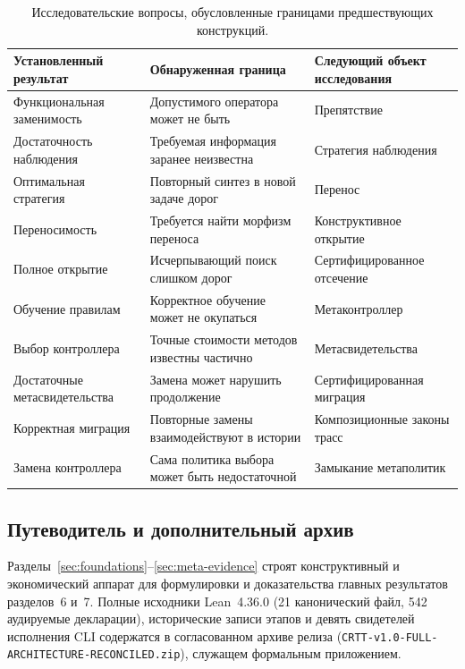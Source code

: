 \documentclass[10pt,a4paper]{article}
\begin{document}
\begin{table}[h]
\centering
\footnotesize
\begin{tabular}{@{}>{\raggedright\arraybackslash}p{3.6cm}>{\raggedright\arraybackslash}p{5.2cm}>{\raggedright\arraybackslash}p{4.6cm}@{}}
\toprule
\textbf{Установленный результат} & \textbf{Обнаруженная граница} & \textbf{Следующий объект исследования} \\
\midrule
Функциональная заменимость & Допустимого оператора может не быть & Препятствие \\
Достаточность наблюдения & Требуемая информация заранее неизвестна & Стратегия наблюдения \\
Оптимальная стратегия & Повторный синтез в новой задаче дорог & Перенос \\
Переносимость & Требуется найти морфизм переноса & Конструктивное открытие \\
Полное открытие & Исчерпывающий поиск слишком дорог & Сертифицированное отсечение \\
Обучение правилам & Корректное обучение может не окупаться & Метаконтроллер \\
Выбор контроллера & Точные стоимости методов известны частично & Метасвидетельства \\
Достаточные метасвидетельства & Замена может нарушить продолжение & Сертифицированная миграция \\
Корректная миграция & Повторные замены взаимодействуют в истории & Композиционные законы трасс \\
Замена контроллера & Сама политика выбора может быть недостаточной & Замыкание метаполитик \\
\bottomrule
\end{tabular}
\caption{Исследовательские вопросы, обусловленные границами предшествующих конструкций.}
\label{tab:genesis}
\end{table}

\subsection{Путеводитель и дополнительный архив}
Разделы~\ref{sec:foundations}--\ref{sec:meta-evidence} строят конструктивный и экономический аппарат для формулировки и доказательства главных результатов разделов~6 и~7. Полные исходники Lean~4.36.0 (21 канонический файл, 542 аудируемые декларации), исторические записи этапов и девять свидетелей исполнения CLI содержатся в согласованном архиве релиза (\texttt{CRTT-v1.0-FULL-ARCHITECTURE-RECONCILED.zip}), служащем формальным приложением.
\end{document}
